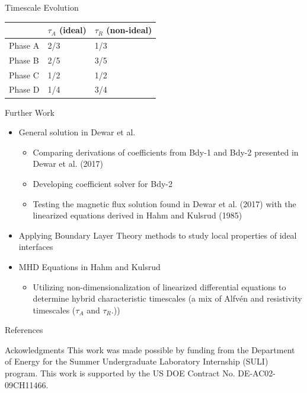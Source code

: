 \documentclass{beamer}
\begin{document}
\begin{frame}[t]
\begin{textblock}{15}
\begin{block}{Timescale Evolution}
\begin{center}
\begin{tabular}{|l|l|l|}
    \hline
        & $\tau_A$ (ideal) & $\tau_R$ (non-ideal) \\
    \hline
        Phase A & 2/3 & 1/3 \\
    \hline
        Phase B & 2/5 & 3/5 \\
    \hline
        Phase C & 1/2 & 1/2 \\
    \hline
        Phase D & 1/4 & 3/4 \\
    \hline
\end{tabular}
\end{center}
\end{block}

\begin{block}{Further Work}
\begin{itemize}
    \item General solution in Dewar et al.
        \begin{itemize}
            \item Comparing derivations of coefficients from Bdy-1 and Bdy-2 presented in Dewar et al. (2017)
            \item Developing coefficient solver for Bdy-2
            \item Testing the magnetic flux solution found in Dewar et al. (2017) with the linearized equations derived in Hahm and Kulsrud (1985)
        \end{itemize}
    \item Applying Boundary Layer Theory methods to study local properties of ideal interfaces
    \item MHD Equations in Hahm and Kulsrud
        \begin{itemize}
            \item Utilizing non-dimensionalization of linearized differential equations to determine hybrid characteristic timescales (a mix of Alfvén and resistivity timescales ($\tau_A$ and $\tau_R$.))
        \end{itemize}
\end{itemize}
\end{block}
\begin{block}{References}
\nocite{lazerson}

\end{block}
\begin{block}{Ackowledgments}
This work was made possible by funding from the Department of Energy for the Summer Undergraduate Laboratory Internship (SULI) program. This work is supported by the US DOE Contract No. DE-AC02-09CH11466.
\end{block}
\end{textblock}
\end{frame}
\end{document}
